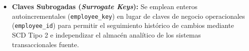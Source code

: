 \begin{engtip}
\begin{itemize}
    \item \textbf{Claves Subrogadas (\textit{Surrogate Keys}):} Se emplean enteros autoincrementales (\texttt{employee\_key}) en lugar de claves de negocio operacionales (\texttt{employee\_id}) para permitir el seguimiento hist\'orico de cambios mediante SCD Tipo 2 e independizar el almac\'en anal\'itico de los sistemas transaccionales fuente.
\end{itemize}
\end{engtip}
